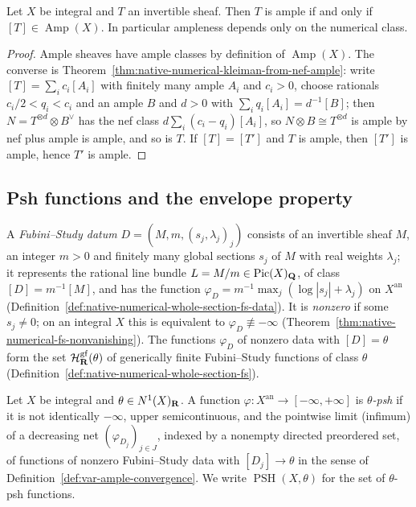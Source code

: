\begin{theorem}
\label{thm:var-numerical-ampleness}
\leanok
{}
Let $X$ be integral and $T$ an invertible sheaf. Then $T$ is ample if and only if
$[T]\in\operatorname{Amp}(X)$. In particular ampleness depends only on the numerical class.
\end{theorem}
\begin{proof}
Ample sheaves have ample classes by definition of $\operatorname{Amp}(X)$. The converse is
Theorem~\ref{thm:native-numerical-kleiman-from-nef-ample}: write $[T]=\sum_i c_i[A_i]$ with
finitely many ample $A_i$ and $c_i>0$, choose rationals $c_i/2<q_i<c_i$ and an ample $B$ and
$d>0$ with $\sum_iq_i[A_i]=d^{-1}[B]$; then $N=T^{\otimes d}\otimes B^\vee$ has the nef class
$d\sum_i(c_i-q_i)[A_i]$, so $N\otimes B\cong T^{\otimes d}$ is ample by nef plus ample is ample,
and so is $T$. If $[T]=[T']$ and $T$ is ample, then $[T']$ is ample, hence $T'$ is ample.
\end{proof}

\subsection{Psh functions and the envelope property}

A \emph{Fubini--Study datum} $D=(M,m,(s_j,\lambda_j)_j)$ consists of an invertible sheaf $M$,
an integer $m>0$ and finitely many global sections $s_j$ of $M$ with real weights $\lambda_j$; it
represents the rational line bundle $L=M/m\in\operatorname{Pic}(X)_{\mathbf{Q}}$, of class
$[D]=m^{-1}[M]$, and has the function $\varphi_D=m^{-1}\max_j(\log|s_j|+\lambda_j)$ on
$X^{\mathrm{an}}$ (Definition~\ref{def:native-numerical-whole-section-fs-data}). It is
\emph{nonzero} if some $s_j\ne0$; on an integral $X$ this is equivalent to
$\varphi_D\not\equiv-\infty$ (Theorem~\ref{thm:native-numerical-fs-nonvanishing}). The functions
$\varphi_D$ of nonzero data with $[D]=\theta$ form the set $\mathcal H^{\mathrm{gf}}_{\mathbf{R}}(\theta)$
of generically finite Fubini--Study functions of class $\theta$
(Definition~\ref{def:native-numerical-whole-section-fs}).

\begin{definition}
\label{def:var-psh}
\leanok
{}
Let $X$ be integral and $\theta\in N^1(X)_{\mathbf{R}}$. A function
$\varphi:X^{\mathrm{an}}\to[-\infty,+\infty]$ is \emph{$\theta$-psh} if it is not identically
$-\infty$, upper semicontinuous, and the pointwise limit (infimum) of a decreasing net
$(\varphi_{D_j})_{j\in J}$, indexed by a nonempty directed preordered set, of functions of
nonzero Fubini--Study data with $[D_j]\to\theta$ in the sense of
Definition~\ref{def:var-ample-convergence}. We write $\operatorname{PSH}(X,\theta)$ for the set
of $\theta$-psh functions.
\end{definition}

